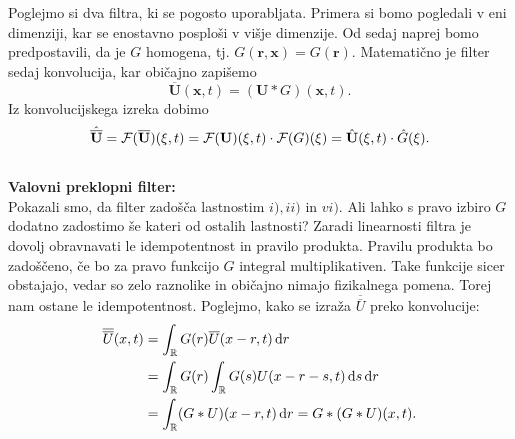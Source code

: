 \documentclass[mat2, tisk]{fmfdelo}
\newcommand{\R}{\mathbb R}
\newcommand{\bd}{\textbf}
\begin{document}

\noindent
Poglejmo si dva filtra, ki se pogosto uporabljata. Primera si bomo pogledali v eni dimenziji, 
kar se enostavno  posploši v višje dimenzije. Od sedaj naprej bomo predpostavili, da je 
$G$ homogena, tj. $G(\bd{r}, \bd{x}) = G(\bd{r})$. Matematično je filter sedaj konvolucija, kar običajno 
zapišemo
\begin{equation*}
\overline{\bd{U}}(\bd{x}, t) = (\bd{U} * G)(\bd{x}, t).
\end{equation*}
Iz konvolucijskega izreka dobimo 
\begin{equation*}
\hat{\overline{\bd{U}}} = \mathcal{F}(\overline{\bd{U}})(\bd{\text{$\xi$}}, t) = \mathcal{F}(\bd{U})(\bd{\text{$\xi$}}, t)\cdot \mathcal{F}(G)(\bd{\text{$\xi$}})= 
\hat{\bd{U}}(\bd{\text{$\xi$}}, t)\cdot \hat{G}(\bd{\text{$\xi$}}).
\end{equation*}
\\[1mm] 

\noindent
\textbf{Valovni preklopni filter:} \\
Pokazali smo, da filter zadošča lastnostim $i), ii)$ in $vi)$. Ali lahko s pravo izbiro 
$G$ dodatno zadostimo še kateri od ostalih lastnosti? Zaradi linearnosti filtra je dovolj obravnavati le
idempotentnost in pravilo produkta. Pravilu produkta bo
zadoščeno, če bo za pravo funkcijo $G$ integral multiplikativen. Take funkcije sicer 
obstajajo, vedar so zelo raznolike in običajno nimajo fizikalnega pomena. Torej nam ostane 
le idempotentnost. Poglejmo, kako se izraža $\overline{\overline{{U}}}$ preko konvolucije:
\begin{align*}
\overline{\overline{{U}}}(x, t) &= \int_{\R} G(r) \overline{{U}}(x - r, t) \dif r \\
&= \int_{\R} G(r) \int_{\R} G(s) {U}(x-r-s, t) \dif s \dif r \\
&= \int_{\R} (G*{U})(x - r, t) \dif r = G*(G * {U})(x, t).
\end{align*}
\end{document}
